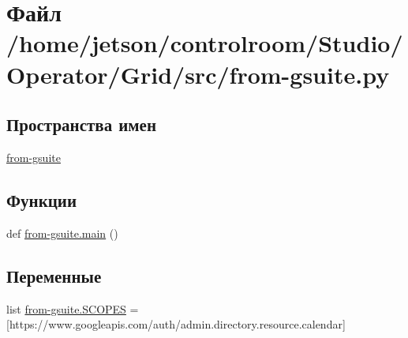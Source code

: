 \hypertarget{_operator_2_grid_2src_2from-gsuite_8py}{}\section{Файл /home/jetson/controlroom/\+Studio/\+Operator/\+Grid/src/from-\/gsuite.py}
\label{_operator_2_grid_2src_2from-gsuite_8py}
\subsection*{Пространства имен}
\begin{DoxyCompactItemize}
\item 
 \hyperlink{namespacefrom-gsuite}{from-\/gsuite}
\end{DoxyCompactItemize}
\subsection*{Функции}
\begin{DoxyCompactItemize}
\item 
def \hyperlink{namespacefrom-gsuite_a431d5ae5f08baa594842e68180930f6c}{from-\/gsuite.\+main} ()
\end{DoxyCompactItemize}
\subsection*{Переменные}
\begin{DoxyCompactItemize}
\item 
list \hyperlink{namespacefrom-gsuite_a359fb1aa3ebe4472fff6f682676e7dc0}{from-\/gsuite.\+S\+C\+O\+P\+ES} = \mbox{[}\textquotesingle{}https\+://www.\+googleapis.\+com/auth/admin.\+directory.\+resource.\+calendar\textquotesingle{}\mbox{]}
\end{DoxyCompactItemize}

